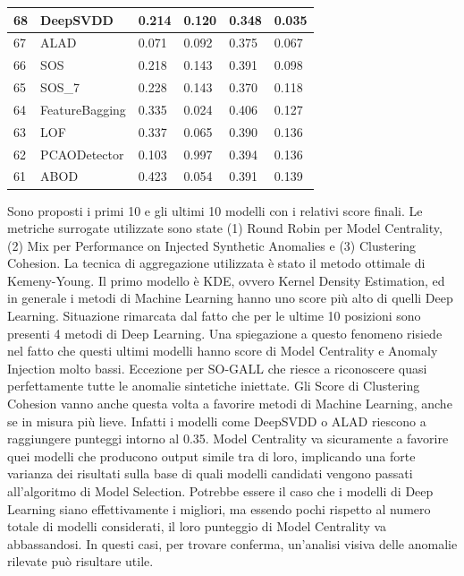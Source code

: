 \begin{table}[H]
\begin{minipage}{.5\textwidth}
{\begin{tabular}{|l|l|l|l|l|l|}
				\hline
				68          & DeepSVDD       & 0.214       & 0.120        & 0.348       & 0.035            \\ 
				\hline
				67          & ALAD           & 0.071       & 0.092        & 0.375       & 0.067            \\ 
				\hline
				66          & SOS            & 0.218       & 0.143        & 0.391       & 0.098            \\ 
				\hline
				65          & SOS\_7         & 0.228       & 0.143        & 0.370       & 0.118            \\ 
				\hline
				64          & FeatureBagging & 0.335       & 0.024        & 0.406       & 0.127            \\ 
				\hline
				63          & LOF            & 0.337       & 0.065        & 0.390       & 0.136            \\ 
				\hline
				62          & PCAODetector   & 0.103       & 0.997        & 0.394       & 0.136            \\ 
				\hline
				61          & ABOD           & 0.423       & 0.054        & 0.391       & 0.139            \\
				\hline
			\end{tabular}}
	\end{minipage}
\end{table}




Sono proposti i primi 10 e gli ultimi 10 modelli con i relativi score finali. Le metriche surrogate utilizzate sono state (1) Round Robin per Model Centrality, (2) Mix per Performance on Injected Synthetic Anomalies e (3) Clustering Cohesion. La tecnica di aggregazione utilizzata è stato il metodo ottimale di Kemeny-Young.
Il primo modello è KDE, ovvero Kernel Density Estimation, ed in generale i metodi di Machine Learning hanno uno score più alto di quelli Deep Learning. Situazione rimarcata dal fatto che per le ultime 10 posizioni sono presenti 4 metodi di Deep Learning. Una spiegazione a questo fenomeno risiede nel fatto che questi ultimi modelli hanno score di Model Centrality e Anomaly Injection molto bassi. Eccezione per SO-GALL che riesce a riconoscere quasi perfettamente tutte le anomalie sintetiche iniettate. Gli Score di Clustering Cohesion vanno anche questa volta a favorire metodi di Machine Learning, anche se in misura più lieve. Infatti i modelli come DeepSVDD o ALAD riescono a  raggiungere punteggi intorno al 0.35.
Model Centrality va sicuramente a favorire quei modelli che producono output simile tra di loro, implicando una forte varianza dei risultati sulla base di quali modelli candidati vengono passati all'algoritmo di Model Selection. Potrebbe essere il caso che i modelli di Deep Learning siano effettivamente i migliori, ma essendo pochi rispetto al numero totale di modelli considerati, il loro punteggio di Model Centrality va abbassandosi. In questi casi, per trovare conferma, un'analisi visiva delle anomalie rilevate può risultare utile.

